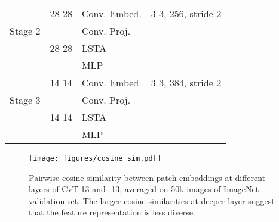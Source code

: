 \begin{table}[]
\begin{tabular}{c|c|l|c|c}
\multirow{4}{*}{Stage 2} & 28  28                  & Conv. Embed. & \multicolumn{2}{c}{3  3, 256, stride 2}                                                                                                                                                               \\ \cline{2-5} 
                         & \multirow{4}{*}{28  28} & Conv. Proj.  & \multicolumn{2}{c}{\multirow{4}{*}{}}                                                                                   \\
                         &                              & \multirow{2}{*}{LSTA}    & \multicolumn{2}{c}{}         \\
                         &                              &                          & \multicolumn{2}{c}{}               \\
                         &                              & MLP          & \multicolumn{2}{c}{}                                                                                                                                                                                       \\ \hline
\multirow{4}{*}{Stage 3} & 14  14                  & Conv. Embed. & \multicolumn{2}{c}{3  3, 384, stride 2}                                                                                                                                                               \\ \cline{2-5} 
                         & \multirow{4}{*}{14  14} & Conv. Proj.  & \multirow{4}{*}{} & \multirow{4}{*}{} \\
                         &                              & \multirow{2}{*}{LSTA}     &                  &         \\
                         &                              &                          &                &               \\
                         &                              & MLP          &                                                                                                      &                                                                                                      \\ 
\hline
\end{tabular}
\end{table}





\begin{figure}
\begin{center}
    \texttt{[image: figures/cosine\_sim.pdf]}
\end{center}
\vspace{-1.5em}
\caption{ Pairwise cosine similarity between patch embeddings at different layers of CvT-13 and \cvtname{}-13, averaged on 50k images of ImageNet validation set. The larger cosine similarities at deeper layer suggest that the feature representation is less diverse.}
\label{fig:cos_sim}
\end{figure}




